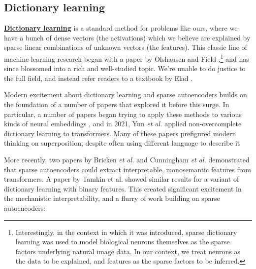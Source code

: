 \documentclass{article}
\let\oldsubsection\subsection
\renewcommand{\subsection}{\FloatBarrier\oldsubsection}
\begin{document}
\subsection{Dictionary learning}\label{sec:related-work-dictionary}

\textbf{\href{https://en.wikipedia.org/wiki/Sparse_dictionary_learning}{Dictionary learning}} is a standard method for problems like ours, where we have a bunch of dense vectors (the activations) which we believe are explained by sparse linear combinations of unknown vectors (the features). This classic line of machine learning research began with a paper by Olshausen and Field \cite{olshausen1997sparse},\footnote{Interestingly, in the context in which it was introduced, sparse dictionary learning was used to model biological neurons themselves as the sparse factors underlying natural image data. In our context, we treat neurons as the data to be explained, and features as the sparse factors to be inferred.} and has since blossomed into a rich and well-studied topic. We're unable to do justice to the full field, and instead refer readers to a textbook by Elad \cite{elad2010sparse}.

Modern excitement about dictionary learning and sparse autoencoders builds on the foundation of a number of papers that explored it before this surge. In particular, a number of papers began trying to apply these methods to various kinds of neural embeddings \cite{arora2018linear,goh2016decoding,faruqui2015sparse,subramanian2018spine,zhang2019word}, and in 2021, Yun \textit{et al. }\cite{yun2021transformer} applied non-overcomplete dictionary learning to transformers. Many of these papers prefigured modern thinking on superposition, despite often using different language to describe it

More recently, two papers by Bricken \textit{et al.} \cite{bricken2023monosemanticity} and Cunningham \textit{et al. }\cite{cunningham2023sparse} demonstrated that sparse autoencoders could extract interpretable, monosemantic features from transformers. A paper by Tamkin et al. \cite{tamkin2023codebook} showed similar results for a variant of dictionary learning with binary features. This created significant excitement in the mechanistic interpretability, and a flurry of work building on sparse autoencoders:
\end{document}
